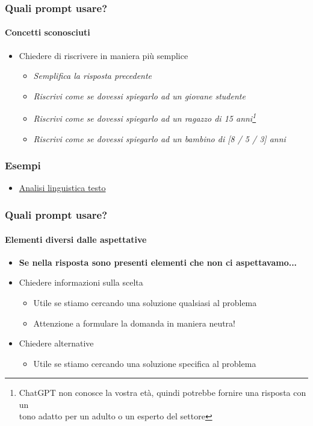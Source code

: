 \begin{exampleframe}
    \frametitle{Quali prompt usare?}
    \framesubtitle{Concetti sconosciuti}

    \begin{itemize}
        \item Chiedere di riscrivere in maniera più semplice
        \begin{itemize}
            \item \textit{Semplifica la risposta precedente}
            \item \textit{Riscrivi come se dovessi spiegarlo ad un giovane studente}
            \item \textit{Riscrivi come se dovessi spiegarlo ad un ragazzo di 15 anni\footnote[frame]{ChatGPT non conosce la vostra età, quindi potrebbe fornire una risposta con un\\tono adatto per un adulto o un esperto del settore}}
            \item \textit{Riscrivi come se dovessi spiegarlo ad un bambino di [8 / 5 / 3] anni}
        \end{itemize}
    \end{itemize}
\end{exampleframe}

\begin{exampleframe}
    \frametitle{Esempi}

    \begin{itemize}
        \item \href{https://chatgpt.com/share/675c1a86-56c4-8003-bd9b-c737657e714a}{Analisi linguistica testo}
    \end{itemize}
\end{exampleframe}

\begin{contentframe}
    \frametitle{Quali prompt usare?}
    \framesubtitle{Elementi diversi dalle aspettative}
    
    \begin{itemize}
        \item \textbf{Se nella risposta sono presenti elementi che non ci aspettavamo...}

        \bigskip
        \item Chiedere informazioni sulla scelta
        \begin{itemize}
            \item Utile se stiamo cercando una soluzione qualsiasi al problema
            \item Attenzione a formulare la domanda in maniera neutra!
        \end{itemize}
        
        \item Chiedere alternative
        \begin{itemize}
            \item Utile se stiamo cercando una soluzione specifica al problema
        \end{itemize}
    \end{itemize}
\end{contentframe}

